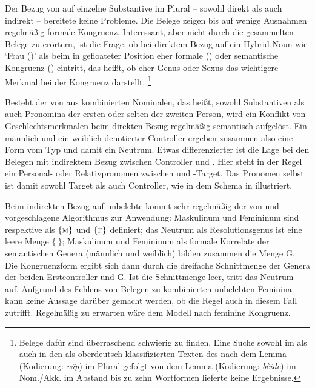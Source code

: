 Der Bezug von  auf einzelne Substantive im Plural --
sowohl direkt als auch indirekt -- bereitete keine Probleme. Die Belege zeigen
bis auf wenige Ausnahmen regelmäßig formale Kongruenz.
Interessant, aber nicht durch die gesammelten Belege zu erörtern, ist die
Frage, ob bei direktem Bezug auf ein Hybrid Noun wie  `Frau (\NeutF)'
als  beim  in gefloateter
Position eher formale () oder semantische
Kongruenz () eintritt, das heißt, ob eher
Genus oder Sexus das wichtigere Merkmal bei
der Kongruenz darstellt.%
%
	\footnote{Belege dafür sind überraschend schwierig zu finden. Eine Suche
		sowohl im \CAO{} als auch in den als oberdeutsch klassifizierten Texten
		des \REM{} nach dem Lemma  (Kodierung: \emph{wîp}) im Plural
		gefolgt von dem Lemma  (Kodierung: \emph{bèide}) im
		Nom./Akk. im Abstand bis zu zehn Wortformen lieferte keine Ergebnisse.}

Besteht der  von  aus kombinierten Nominalen, das
heißt, sowohl Substantiven als auch Pronomina der ersten oder
selten der zweiten Person, wird ein Konflikt von
Geschlechtsmerkmalen beim direkten Bezug regelmäßig semantisch
aufgelöst. Ein männlich und ein weiblich denotierter Controller
ergeben zusammen also eine Form vom Typ  und damit ein Neutrum.
Etwas differenzierter ist die Lage bei den Belegen mit indirektem Bezug
zwischen Controller und . Hier steht in der Regel ein
Personal- oder Relativpronomen
zwischen  und -Target. Das Pronomen selbst ist
damit sowohl Target als auch Controller, wie in dem Schema in
 illustriert.

Beim indirekten Bezug auf unbelebte  kommt
sehr regelmäßig der von \citet[577]{wechsler2009} und
\citet[184]{wechslerzlatic2003} vorgeschlagene Algorithmus zur Anwendung:
Maskulinum und Femininum sind respektive als $\{\textsc{m}\}$ und
$\{\textsc{f}\}$ definiert; das Neutrum als Resolutionsgenus ist eine leere Menge $\{\ \}$; Maskulinum und Femininum als formale
Korrelate der semantischen Genera (männlich und weiblich) bilden
zusammen die Menge G. Die Kongruenzform ergibt sich dann durch die
dreifache Schnittmenge der Genera der beiden Erstcontroller und G. Ist
die Schnittmenge leer, tritt das Neutrum auf. Aufgrund des Fehlens von Belegen
zu kombinierten unbelebten Feminina kann keine Aussage darüber gemacht werden,
ob die Regel auch in diesem Fall zutrifft. Regelmäßig zu erwarten wäre dem
Modell nach feminine Kongruenz.

